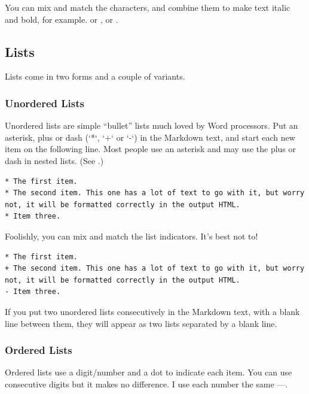 You can mix and match the characters, and combine them to make text italic and bold, for example.  or , or .

\subsection{Lists}\label{sect: Lists}
Lists come in two forms and a couple of variants.

\subsubsection{Unordered Lists}\label{sect: Unordered Lists}

Unordered lists are simple ``bullet'' lists much loved by Word processors. Put an asterisk, plus or dash (`*`, `+` or `-`) in the Markdown text, and start each new item on the following line. Most people use an asterisk and may use the plus or dash in nested lists. (See .)

\begin{lstlisting}[caption={Unordered lists.},style=myText]
* The first item.
* The second item. This one has a lot of text to go with it, but worry not, it will be formatted correctly in the output HTML.
* Item three.
\end{lstlisting}

Foolishly, you can mix and match the list indicators. It's best not to!

\begin{lstlisting}[caption={Unordered lists.},style=myText]
* The first item.
+ The second item. This one has a lot of text to go with it, but worry not, it will be formatted correctly in the output HTML.
- Item three.
\end{lstlisting}

If you put two unordered lists consecutively in the Markdown text, with a blank line between them, they will appear as two lists separated by a blank line.

\subsubsection{Ordered Lists}\label{sect: Ordered Lists}

Ordered lists use a digit/number and a dot to indicate each item. You can use consecutive digits but it makes no difference. I use each number the same ---.

